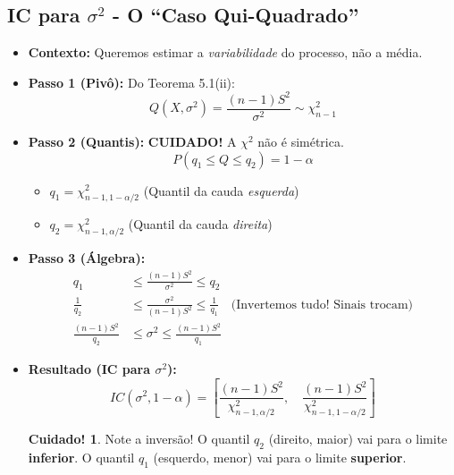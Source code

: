 \documentclass[12pt, a4paper]{article}
\theoremstyle{definition} %
\newtheorem{aviso}{Cuidado!}[section]
\theoremstyle{remark} %
\begin{document}
\subsection{\texorpdfstring{IC para $\sigma^2$ - O ``Caso Qui-Quadrado''}{IC para sigma^2 - O ``Caso Qui-Quadrado''}}
\begin{itemize}
    \item \textbf{Contexto:} Queremos estimar a \textit{variabilidade} do processo, não a média.
    \item \textbf{Passo 1 (Pivô):} Do Teorema 5.1(ii):
        $$ Q(X, \sigma^2) = \frac{(n-1)S^2}{\sigma^2} \sim \chi^2_{n-1} $$
    \item \textbf{Passo 2 (Quantis):} \textbf{CUIDADO!} A $\chi^2$ não é simétrica.
        $$ P(q_1 \le Q \le q_2) = 1-\alpha $$
        \begin{itemize}
            \item $q_1 = \chi^2_{n-1, 1-\alpha/2}$ (Quantil da cauda \textit{esquerda})
            \item $q_2 = \chi^2_{n-1, \alpha/2}$ (Quantil da cauda \textit{direita})
        \end{itemize}
    \item \textbf{Passo 3 (Álgebra):}
    \begin{align*}
        q_1 &\le \frac{(n-1)S^2}{\sigma^2} \le q_2 \\
        \frac{1}{q_2} &\le \frac{\sigma^2}{(n-1)S^2} \le \frac{1}{q_1} \quad \text{(Invertemos tudo! Sinais trocam)} \\
        \frac{(n-1)S^2}{q_2} &\le \sigma^2 \le \frac{(n-1)S^2}{q_1}
    \end{align*}
    \item \textbf{Resultado (IC para $\sigma^2$):}
        $$ IC(\sigma^2, 1-\alpha) = \left[ \frac{(n-1)S^2}{\chi^2_{n-1, \alpha/2}}, \quad \frac{(n-1)S^2}{\chi^2_{n-1, 1-\alpha/2}} \right] $$
    \begin{aviso}
        Note a inversão! O quantil $q_2$ (direito, maior) vai para o limite \textbf{inferior}. O quantil $q_1$ (esquerdo, menor) vai para o limite \textbf{superior}.
    \end{aviso}
\end{itemize}
\end{document}
